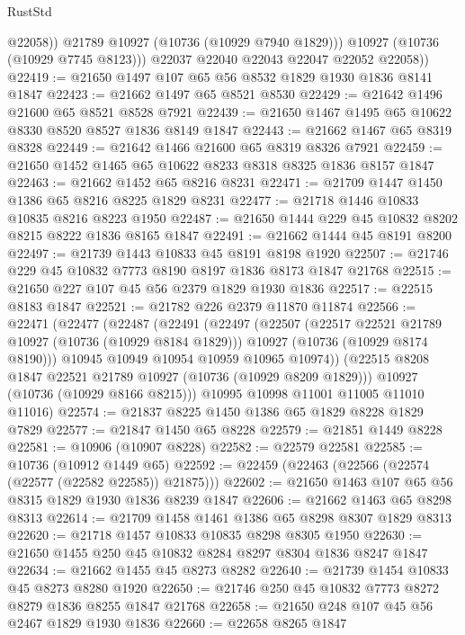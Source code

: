 \begin{lexlean}{RustStd}
\begin{coremodule}
                @22058))
            @21789
            @10927
            (@10736 (@10929 @7940 @1829)))
          @10927
          (@10736 (@10929 @7745 @8123)))
        @22037
        @22040
        @22043
        @22047
        @22052
        @22058))
@22419 := @21650 @1497 @107 @65 @56 @8532 @1829 @1930 @1836 @8141 @1847
@22423 := @21662 @1497 @65 @8521 @8530
@22429 := @21642 @1496 @21600 @65 @8521 @8528 @7921
@22439 := @21650 @1467 @1495 @65 @10622 @8330 @8520 @8527 @1836 @8149 @1847
@22443 := @21662 @1467 @65 @8319 @8328
@22449 := @21642 @1466 @21600 @65 @8319 @8326 @7921
@22459 := @21650 @1452 @1465 @65 @10622 @8233 @8318 @8325 @1836 @8157 @1847
@22463 := @21662 @1452 @65 @8216 @8231
@22471 := @21709 @1447 @1450 @1386 @65 @8216 @8225 @1829 @8231
@22477 := @21718 @1446 @10833 @10835 @8216 @8223 @1950
@22487 := @21650 @1444 @229 @45 @10832 @8202 @8215 @8222 @1836 @8165 @1847
@22491 := @21662 @1444 @45 @8191 @8200
@22497 := @21739 @1443 @10833 @45 @8191 @8198 @1920
@22507 := @21746 @229 @45 @10832 @7773 @8190 @8197 @1836 @8173 @1847 @21768
@22515 := @21650 @227 @107 @45 @56 @2379 @1829 @1930 @1836
@22517 := @22515 @8183 @1847
@22521 := @21782 @226 @2379 @11870 @11874
@22566 := @22471
    (@22477
      (@22487
        (@22491
          (@22497
            (@22507
              (@22517 @22521 @21789 @10927 (@10736 (@10929 @8184 @1829)))
              @10927
              (@10736 (@10929 @8174 @8190)))
            @10945
            @10949
            @10954
            @10959
            @10965
            @10974))
        (@22515 @8208 @1847 @22521 @21789 @10927 (@10736 (@10929 @8209 @1829)))
        @10927
        (@10736 (@10929 @8166 @8215)))
      @10995
      @10998
      @11001
      @11005
      @11010
      @11016)
@22574 := @21837 @8225 @1450 @1386 @65 @1829 @8228 @1829 @7829
@22577 := @21847 @1450 @65 @8228
@22579 := @21851 @1449 @8228
@22581 := @10906 (@10907 @8228)
@22582 := @22579 @22581
@22585 := @10736 (@10912 @1449 @65)
@22592 := @22459 (@22463 (@22566 (@22574 (@22577 (@22582 @22585)) @21875)))
@22602 := @21650 @1463 @107 @65 @56 @8315 @1829 @1930 @1836 @8239 @1847
@22606 := @21662 @1463 @65 @8298 @8313
@22614 := @21709 @1458 @1461 @1386 @65 @8298 @8307 @1829 @8313
@22620 := @21718 @1457 @10833 @10835 @8298 @8305 @1950
@22630 := @21650 @1455 @250 @45 @10832 @8284 @8297 @8304 @1836 @8247 @1847
@22634 := @21662 @1455 @45 @8273 @8282
@22640 := @21739 @1454 @10833 @45 @8273 @8280 @1920
@22650 := @21746 @250 @45 @10832 @7773 @8272 @8279 @1836 @8255 @1847 @21768
@22658 := @21650 @248 @107 @45 @56 @2467 @1829 @1930 @1836
@22660 := @22658 @8265 @1847

\end{coremodule}
\end{lexlean}
